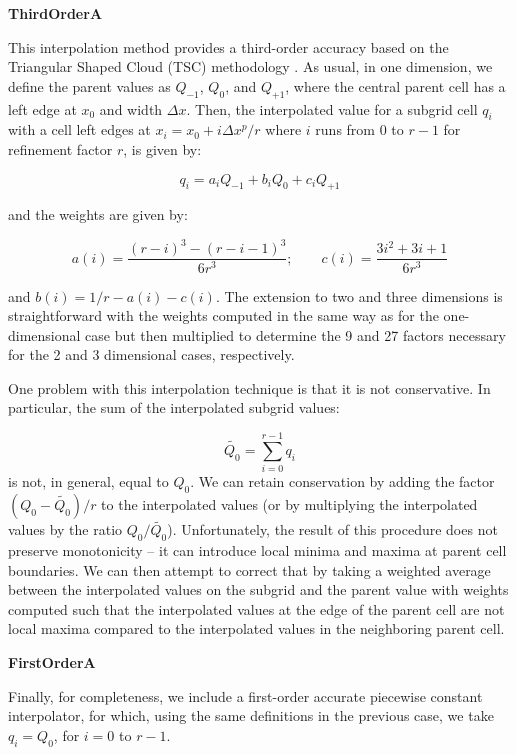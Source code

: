 
\vspace{0.3cm}\noindent
{\bf ThirdOrderA} 

This interpolation method provides a third-order accuracy based on the
Triangular Shaped Cloud (TSC) methodology \citep{Hockney88}.  As
usual, in one dimension, we define the parent values as $Q_{-1}$,
$Q_0$, and $Q_{+1}$, where the central parent cell has a left edge at
$x_0$ and width $\Delta x$.  Then, the interpolated value for a
subgrid cell $q_i$ with a cell left edges at $x_i = x_0 + i \Delta
x^p/r$ where $i$ runs from 0 to $r-1$ for refinement factor $r$, is
given by:

\begin{equation}
q_i = a_i  Q_{-1} + b_i Q_0 + c_i Q_{+1}
\end{equation}

and the weights are given by:

\begin{equation}
a(i) =  \frac{(r-i)^3 - (r-i-1)^3}{6r^3}; \qquad c(i) = \frac{3i^2 + 3i + 1}{6r^3}
\end{equation}

and $b(i) = 1/r - a(i) - c(i)$.  The extension to two and three
dimensions is straightforward with the weights computed in the same
way as for the one-dimensional case but then multiplied to determine
the 9 and 27 factors necessary for the 2 and 3 dimensional cases,
respectively.

One problem with this interpolation technique is that it is not
conservative.  In particular, the sum of the interpolated subgrid
values:

\begin{equation}
\tilde{Q_0} = \sum_{i=0}^{r-1} q_i
\end{equation}
is not, in general, equal to $Q_0$.  We can retain conservation by
adding the factor $(Q_0 - \tilde{Q_0})/r$ to the interpolated values
(or by multiplying the interpolated values by the ratio
$Q_0/\tilde{Q_0}$).  Unfortunately, the result of this procedure does
not preserve monotonicity -- it can introduce local minima and maxima
at parent cell boundaries.  We can then attempt to correct that by
taking a weighted average between the interpolated values on the
subgrid and the parent value with weights computed such that the
interpolated values at the edge of the parent cell are not local
maxima compared to the interpolated values in the neighboring parent
cell.



\vspace{0.3cm}\noindent
{\bf FirstOrderA}

Finally, for completeness, we include a first-order accurate piecewise
constant interpolator, for which, using the same definitions in the
previous case, we take $q_i = Q_0$, for $i = 0$ to $r-1$. 

\vspace{1cm}

